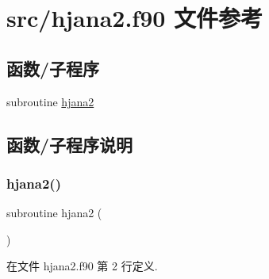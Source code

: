 \hypertarget{hjana2_8f90}{}\section{src/hjana2.f90 文件参考}
\label{hjana2_8f90}
\subsection*{函数/子程序}
\begin{DoxyCompactItemize}
\item 
subroutine \mbox{\hyperlink{hjana2_8f90_a343d9a46a23ebf1e9daf21fe98479b87}{hjana2}}
\end{DoxyCompactItemize}


\subsection{函数/子程序说明}
\mbox{\label{hjana2_8f90_a343d9a46a23ebf1e9daf21fe98479b87}} 
\subsubsection{\texorpdfstring{hjana2()}{hjana2()}}
{\footnotesize\ttfamily subroutine hjana2 (\begin{DoxyParamCaption}{ }\end{DoxyParamCaption})}



在文件 hjana2.\+f90 第 2 行定义.


